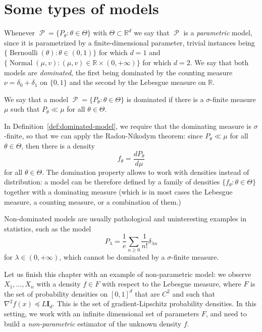\documentclass[
	fontsize=11pt, %
	twoside=false, %
	numbers=noenddot, %
]{kaobook}
\DeclareMathOperator{\cP}{\mathcal P}
\DeclareMathOperator{\nor}{Normal}
\DeclareMathOperator{\ber}{Bernoulli}
\newcommand{\R}{\mathbb R}
\newcommand{\grad}{\nabla}
\newcommand{\mleq}{\preccurlyeq}
\begin{document}
\section{Some types of models} %
\label{sec:some_types_of_models}

Whenever $\cP = \{ P_\theta : \theta \in \Theta \}$ with $\Theta \subset \R^d$ we say that $\cP$ is a \emph{parametric} model, since it is parametrized by a finite-dimensional parameter, trivial instances being $\{ \ber(\theta) : \theta \in (0, 1) \}$ for which $d=1$ and $\{ \nor(\mu, v) : (\mu, v) \in \R \times (0, +\infty) \}$ for which $d=2$.
We say that both models are \emph{dominated}, the first being dominated by the counting measure $\nu = \delta_0 + \delta_1$ on $\{ 0, 1\}$ and the second by the Lebesgue measure on $\R$.
\begin{definition}
	\label{def:dominated-model}
	We say that a model $\cP = \{ P_\theta : \theta \in \Theta \}$ is dominated if there is a $\sigma$-finite measure $\mu$ such that $P_\theta \ll \mu$ for all $\theta \in \Theta$.
\end{definition}
In Definition~\ref{def:dominated-model}, we require that the dominating measure is $\sigma$-finite, so that we can apply the Radon-Nikodym theorem: since $P_\theta \ll \mu$ for all $\theta \in \Theta$, then there is a density 
\begin{equation*}
	f_\theta = \frac{dP_\theta}{d\mu}
\end{equation*}
for all $\theta \in \Theta$.
The domination property allows to work with densities instead of distribution: a model can be therefore defined by a family of densities $\{ f_\theta : \theta \in \Theta \}$ together with a dominating measure (which is in most cases the Lebesgue measure, a counting measure, or a combination of them.)

Non-dominated models are usually pathological and uninteresting examples in statistics, such as the model
\begin{equation*}
	P_\lambda = \frac 1e \sum_{n \geq 0} \frac{1}{n!} \delta_{\lambda n}
\end{equation*}
for $\lambda \in (0, +\infty)$, which cannot be dominated by a $\sigma$-finite measure.

Let us finish this chapter with an example of non-parametric model: we observe $X_1, \ldots, X_n$ with a density $f \in F$ with respect to the Lebesgue measure, where $F$ is the set of probability densities on $[0, 1]^d$ that are $C^2$ and such that $\grad^2 f(x) \mleq L \mathbf I_d$. This is the set of gradient-Lipschitz probability densities.
In this setting, we work with an infinite dimensional set of parameters $F$, and need to build a \emph{non-parametric} estimator of the unknown density $f$.
\end{document}
